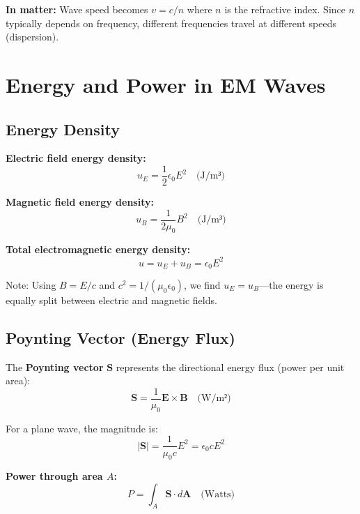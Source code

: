 \textbf{In matter:} Wave speed becomes $v = c/n$ where $n$ is the refractive index. Since $n$ typically depends on frequency, different frequencies travel at different speeds (dispersion).

\section{Energy and Power in EM Waves}

\subsection{Energy Density}

\textbf{Electric field energy density:}
\begin{equation}
u_E = \frac{1}{2}\epsilon_0 E^2 \quad \text{(J/m³)}
\label{eq:energy-E}
\end{equation}

\textbf{Magnetic field energy density:}
\begin{equation}
u_B = \frac{1}{2\mu_0} B^2 \quad \text{(J/m³)}
\label{eq:energy-B}
\end{equation}

\textbf{Total electromagnetic energy density:}
\begin{equation}
u = u_E + u_B = \epsilon_0 E^2
\label{eq:energy-total}
\end{equation}

Note: Using $B = E/c$ and $c^2 = 1/(\mu_0\epsilon_0)$, we find $u_E = u_B$---the energy is equally split between electric and magnetic fields.

\subsection{Poynting Vector (Energy Flux)}

The \textbf{Poynting vector} $\mathbf{S}$ represents the directional energy flux (power per unit area):
\begin{equation}
\mathbf{S} = \frac{1}{\mu_0} \mathbf{E} \times \mathbf{B} \quad \text{(W/m²)}
\label{eq:poynting}
\end{equation}

For a plane wave, the magnitude is:
\begin{equation}
|\mathbf{S}| = \frac{1}{\mu_0 c} E^2 = \epsilon_0 c E^2
\label{eq:poynting-mag}
\end{equation}

\textbf{Power through area $A$:}
\begin{equation}
P = \int_A \mathbf{S} \cdot d\mathbf{A} \quad \text{(Watts)}
\label{eq:power-area}
\end{equation}

